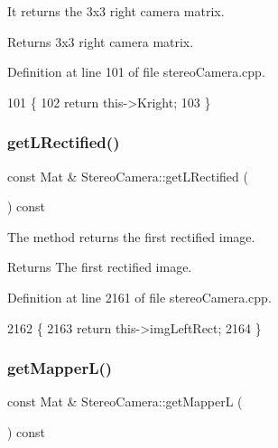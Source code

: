 It returns the 3x3 right camera matrix. 

\begin{DoxyReturn}{Returns}
3x3 right camera matrix. 
\end{DoxyReturn}


Definition at line 101 of file stereo\+Camera.\+cpp.


\begin{DoxyCode}
101                                          \{
102     \textcolor{keywordflow}{return} this->Kright;
103 \}
\end{DoxyCode}
\mbox{\label{classStereoCamera_ad81c9f7f4f15ef3f1e61d34fd8df9856}} 
\subsubsection{\texorpdfstring{get\+L\+Rectified()}{getLRectified()}}
{\footnotesize\ttfamily const Mat \& Stereo\+Camera\+::get\+L\+Rectified (\begin{DoxyParamCaption}{ }\end{DoxyParamCaption}) const}



The method returns the first rectified image. 

\begin{DoxyReturn}{Returns}
The first rectified image. 
\end{DoxyReturn}


Definition at line 2161 of file stereo\+Camera.\+cpp.


\begin{DoxyCode}
2162 \{
2163     \textcolor{keywordflow}{return} this->imgLeftRect;
2164 \}
\end{DoxyCode}
\mbox{\label{classStereoCamera_ae1c7ef2cc1a3de5d10c6bb39fbb78719}} 
\subsubsection{\texorpdfstring{get\+Mapper\+L()}{getMapperL()}}
{\footnotesize\ttfamily const Mat \& Stereo\+Camera\+::get\+MapperL (\begin{DoxyParamCaption}{ }\end{DoxyParamCaption}) const}



